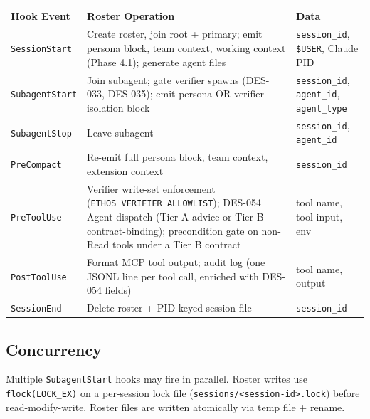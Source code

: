 \documentclass[a4paper,10pt]{article}
\newcommand{\field}[1]{\texttt{#1}}
\newcommand{\fpath}[1]{\texttt{#1}}
\begin{document}
\begin{center}
\begin{tabular}{@{}llp{4.5cm}@{}}
\toprule
\textbf{Hook Event} & \textbf{Roster Operation} & \textbf{Data} \\
\midrule
\texttt{SessionStart}  & Create roster, join root + primary; emit
                          persona block, team context, working
                          context (Phase 4.1); generate agent files
                        & \field{session\_id}, \texttt{\$USER},
                          Claude PID \\
\texttt{SubagentStart}  & Join subagent; gate verifier spawns
                          (DES-033, DES-035); emit persona OR
                          verifier isolation block
                        & \field{session\_id}, \field{agent\_id},
                          \field{agent\_type} \\
\texttt{SubagentStop}   & Leave subagent
                        & \field{session\_id}, \field{agent\_id} \\
\texttt{PreCompact}     & Re-emit full persona block, team context,
                          extension context
                        & \field{session\_id} \\
\texttt{PreToolUse}     & Verifier write-set enforcement
                          (\texttt{ETHOS\_VERIFIER\_ALLOWLIST});
                          DES-054 Agent dispatch (Tier A advice or
                          Tier B contract-binding); precondition
                          gate on non-Read tools under a Tier B
                          contract
                        & tool name, tool input, env \\
\texttt{PostToolUse}    & Format MCP tool output; audit log
                          (one JSONL line per tool call, enriched
                          with DES-054 fields)
                        & tool name, output \\
\texttt{SessionEnd}     & Delete roster + PID-keyed session file
                        & \field{session\_id} \\
\bottomrule
\end{tabular}
\end{center}

\subsection{Concurrency}

Multiple \texttt{SubagentStart} hooks may fire in parallel.  Roster
writes use \texttt{flock(LOCK\_EX)} on a per-session lock file
(\fpath{sessions/<session-id>.lock}) before read-modify-write.  Roster
files are written atomically via temp file + rename.
\end{document}

